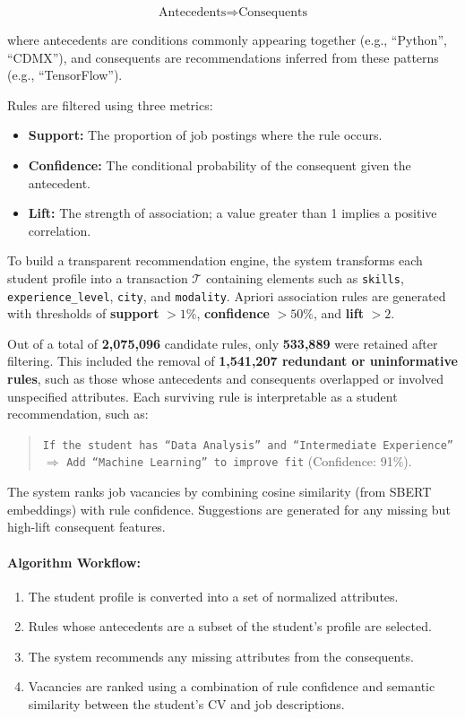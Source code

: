 \documentclass[runningheads]{llncs}
\begin{document}
	\[
	\text{Antecedents} \Rightarrow \text{Consequents}
	\]
	
	where antecedents are conditions commonly appearing together (e.g., ``Python'', ``CDMX''), and consequents are recommendations inferred from these patterns (e.g., ``TensorFlow'').
	
	Rules are filtered using three metrics:
	\begin{itemize}
		\item \textbf{Support:} The proportion of job postings where the rule occurs.
		\item \textbf{Confidence:} The conditional probability of the consequent given the antecedent.
		\item \textbf{Lift:} The strength of association; a value greater than 1 implies a positive correlation.
	\end{itemize}
	
	To build a transparent recommendation engine, the system transforms each student profile into a transaction $\mathcal{T}$ containing elements such as \texttt{skills}, \texttt{experience\_level}, \texttt{city}, and \texttt{modality}. Apriori association rules are generated with thresholds of \textbf{support} $> 1\%$, \textbf{confidence} $> 50\%$, and \textbf{lift} $> 2$. 
	
	Out of a total of \textbf{2,075,096} candidate rules, only \textbf{533,889} were retained after filtering. This included the removal of \textbf{1,541,207 redundant or uninformative rules}, such as those whose antecedents and consequents overlapped or involved unspecified attributes. Each surviving rule is interpretable as a student recommendation, such as:
	
	\begin{quote}
		\small
		\texttt{If the student has “Data Analysis” and “Intermediate Experience”} $\Rightarrow$ \texttt{Add “Machine Learning” to improve fit} (Confidence: 91\%).
	\end{quote}
	
	The system ranks job vacancies by combining cosine similarity (from SBERT embeddings) with rule confidence. Suggestions are generated for any missing but high-lift consequent features.
	
	\vspace{0.5em}
	
	
	\paragraph{Algorithm Workflow:}
	\begin{enumerate}
		\item The student profile is converted into a set of normalized attributes.
		\item Rules whose antecedents are a subset of the student's profile are selected.
		\item The system recommends any missing attributes from the consequents.
		\item Vacancies are ranked using a combination of rule confidence and semantic similarity between the student's CV and job descriptions.
	\end{enumerate}
	
\end{document}
